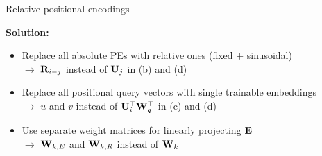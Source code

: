 \documentclass[11pt,compress,t,notes=noshow, xcolor=table]{beamer}
\begin{document}
\begin{vbframe}{Relative positional encodings}

\vfill

\textbf{Solution:}

\begin{itemize}
	\item Replace all absolute PEs with relative ones (fixed $+$ sinusoidal)\\
				$\to$ ${\mathbf{R}}_{i-j}$ instead of ${\mathbf{U}}_{j}$ in (b) and (d)
	\item Replace all positional query vectors with single trainable embeddings\\
				$\to$ $u$ and $v$ instead of ${\mathbf{U}}_{i}^\top {\mathbf{W}}_q^\top$ in (c) and (d)
	\item Use separate weight matrices for linearly projecting ${\mathbf{E}}$\\
				$\to$ ${\mathbf{W}}_{k,E}$ and ${\mathbf{W}}_{k,R}$ instead of ${\mathbf{W}}_{k}$
\end{itemize}

\vfill

\end{vbframe}


\endlecture
\end{document}
